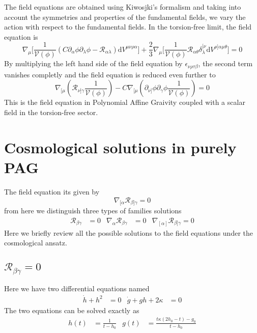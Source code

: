 \documentclass[10pt,a4paper]{article}
\begin{document}
The field equations are obtained using Kiwosjki's formalism and taking into account the symmetries and properties of the fundamental fields, we 
vary the action with respect to the fundamental fields. In the torsion-free limit, the field equation is
\begin{equation}
  \nabla_\mu \biggl[\frac{1}{\mathcal{V}(\phi)} \left(C \partial_\alpha \phi \partial_\lambda \phi - \mathcal{R}_{\alpha\lambda}\right)\mathrm{d}V^{\mu\nu\rho\alpha}\biggr] 
  + \frac{2}{3}\nabla_\mu \biggl[ \frac{1}{\mathcal{V}(\phi)}\mathcal{R}_{\alpha\theta} \delta^{[\nu}_{\lambda}\mathrm{d}V^{\rho]\alpha\mu\theta} \biggr] = 0
\end{equation}
By multiplying the left hand side of the field equation by $\epsilon_{\nu\rho\tau\beta}$, the second term vanishes completly and the field 
equation is reduced even further to
\begin{equation}
  \nabla_{[\mu}\left(\mathcal{R}_{\nu]\gamma}\frac{1}{\mathcal{V}(\phi)}\right) 
  - C \nabla_{[\mu}\left(\partial_{\nu]} \phi \partial_\gamma \phi \frac{1}{\mathcal{V}(\phi)}\right) = 0
\end{equation}
This is the field equation in Polynomial Affine Graivity coupled with a scalar field in the torsion-free sector.

\section{Cosmological solutions in purely PAG}

The field equation its given by 
\begin{equation}
  \nabla_{[\alpha}\mathcal{R}_{\beta]\gamma} = 0
\end{equation}
from here we distinguish three types of families solutions
\begin{align}
  \mathcal{R}_{\beta\gamma} & = 0 & \nabla_{\alpha}\mathcal{R}_{\beta\gamma} & = 0 & \nabla_{[\alpha]}\mathcal{R}_{\beta]\gamma} = 0
\end{align}
Here we briefly review all the possible solutions to the field equations under the cosmological ansatz.

\subsection{$\mathcal{R}_{\beta\gamma} = 0$}

Here we have two differential equations named
\begin{align}
  \dot{h} + h^2 & = 0 & \dot{g} + gh + 2\kappa & = 0
\end{align}
The two equations can be solved exactly as
\begin{align}
  h(t) & = \frac{1}{t - h_0} & g(t) & =  \frac{t\kappa\left(2h_0 - t\right) - g_0}{t - h_0}
\end{align}
\end{document}

